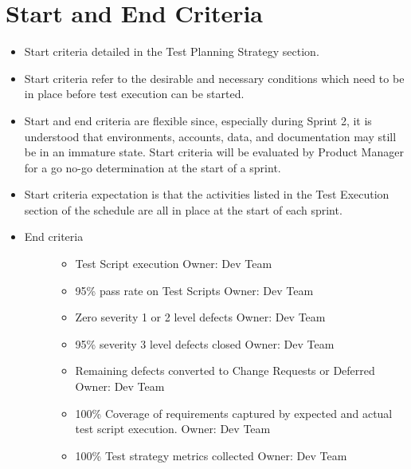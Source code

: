 \documentclass[letterpaper,10pt,english]{sphinxmanual}
\begin{document}
\section{Start and End Criteria}
\label{\detokenize{test_plan/issue_management:start-and-end-criteria}}\begin{itemize}
\item {} 
Start criteria detailed in the Test Planning Strategy section.

\item {} 
Start criteria refer to the desirable and necessary conditions which need to be in place before test execution can be started.

\item {} 
Start and end criteria are flexible since, especially during Sprint 2, it is understood that environments, accounts, data, and documentation may still be in an immature state.  Start criteria will be evaluated by Product Manager for a go no-go determination at the start of a sprint.

\item {} 
Start criteria expectation is that the activities listed in the Test Execution section of the schedule are all in place at the start of each sprint.

\item {} \begin{description}
\item[{End criteria}] \leavevmode\begin{itemize}
\item {} 
Test Script execution     Owner: Dev Team

\item {} 
95\% pass rate on Test Scripts             Owner: Dev Team

\item {} 
Zero severity 1 or 2 level defects                Owner: Dev Team

\item {} 
95\% severity 3 level defects closed               Owner: Dev Team

\item {} 
Remaining defects converted to Change Requests or Deferred   Owner: Dev Team

\item {} 
100\% Coverage of requirements captured by expected and actual test script execution.                              Owner: Dev Team

\item {} 
100\% Test strategy metrics collected      Owner: Dev Team


\end{itemize}
\end{description}
\end{itemize}
\end{document}
